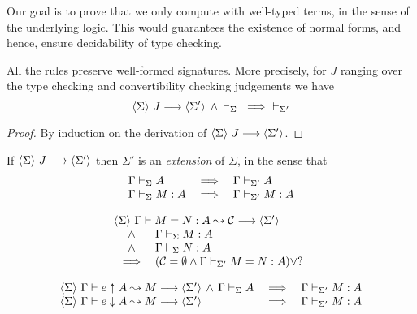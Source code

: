 
Our goal is to prove that we only compute with well-typed terms, in the sense
of the underlying logic. This would guarantees the existence of normal forms,
and hence, ensure decidability of type checking.

\begin{lemma}
    All the rules preserve well-formed signatures. More precisely, for $J$
    ranging over the type checking and convertibility checking judgements we
    have
    \[{\langle {\Sigma} \rangle ~{J} \longrightarrow \langle {\Sigma'} \rangle} \, \mathrel{\wedge} \,
	{\vdash_{\Sigma}}  ~ \implies ~ \vdash_{\Sigma'}
    \]
\end{lemma}
\begin{proof}
    By induction on the derivation of $\langle {\Sigma} \rangle ~{J} \longrightarrow \langle {\Sigma'} \rangle$.
\end{proof}

\begin{lemma} \label{lemExtendSig}
    If $\langle {\Sigma} \rangle ~{J} \longrightarrow \langle {\Sigma'} \rangle$ then $\Sigma'$ is an {\em
    extension} of $\Sigma$, in the sense that
    \[\begin{array}{lcl}
	\Gamma\vdash_{\Sigma}A & \implies & \Gamma\vdash_{\Sigma'}A \\
	\Gamma\vdash_{\Sigma}M:A & \implies & \Gamma\vdash_{\Sigma'}M:A
    \end{array}\]
\end{lemma}

\begin{theorem}
    \[\begin{array}{l}
	{ \langle {\Sigma} \rangle ~{{\Gamma} \vdash {M} = {N} : {A} \leadsto {\mathcal{C}}} \longrightarrow \langle {\Sigma'} \rangle } \\
	\begin{array}{cl}
	\wedge & \Gamma\vdash_{\Sigma}M:A \\
	\wedge & \Gamma\vdash_{\Sigma}N:A \\
	\implies & (\mathcal{C} = \emptyset \wedge \Gamma\vdash_{\Sigma'}M=N:A) \vee ?
	\end{array}
    \end{array}\]
\end{theorem}

\begin{theorem} \label{thmTypeSafety}
    \[\begin{array}{lcl}
	{ \langle {\Sigma} \rangle ~{{\Gamma} \vdash {e} \uparrow {A} \leadsto {M}} \longrightarrow \langle {\Sigma'} \rangle }
	\, \wedge \, {\Gamma\vdash_{\Sigma}A}
	& \implies & \Gamma\vdash_{\Sigma'}M:A \\
	{\langle {\Sigma} \rangle ~{{\Gamma} \vdash {e} \downarrow {A} \leadsto {M}} \longrightarrow \langle {\Sigma'} \rangle}
	& \implies & \Gamma\vdash_{\Sigma'}M:A
    \end{array}\]
\end{theorem}


